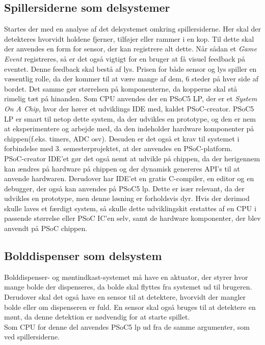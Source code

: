 \documentclass[Rapport/Rapport_main.tex]{subfiles}
\begin{document}
\subsection{Spillersiderne som delsystemer}
Startes der med en analyse af det delsystemet omkring spillersiderne. Her skal der detekteres hvorvidt holdene fjerner, tilføjer eller rammer i en kop. Til dette skal der anvendes en form for sensor, der kan registrere alt dette. Når sådan et \textit{Game Event} registreres, så er det også vigtigt for en bruger at få visuel feedback på eventet. Denne feedback skal bestå af lys. Prisen for både sensor og lys spiller en væsentlig rolle, da der kommer til at være mange af dem, 6 steder på hver side af bordet. Det samme gør størrelsen på komponenterne, da kopperne skal stå rimelig tæt på hinanden.
Som CPU anvendes der en PSoC5 LP, der er et \textit{System On A Chip}, hvor der hører et udviklings IDE med, kaldet PSoC-creator. PSoC5 LP er smart til netop dette system, da der udvikles en prototype, og den er nem at eksperimentere og arbejde med, da den indeholder hardware komponenter på chippen(f.eks. timers, ADC osv). Desuden er det også et krav til systemet i forbindelse med 3. semesterprojektet\cite{}, at der anvendes en PSoC-platform.\\ PSoC-creator IDE'et gør det også nemt at udvikle på chippen, da der herigennem kan ændres på hardware på chippen og der dynamisk genereres API's til at anvende hardwaren. Derudover har IDE'et en gratis C-compiler, en editor og en debugger, der også kan anvendes på PSoC5 lp. Dette er især relevant, da der udvikles en prototype, men denne løsning er forholdsvis dyr. Hvis der derimod skulle laves et færdigt system, så skulle dette udviklingskit erstattes af en CPU i passende størrelse eller PSoC IC'en selv, samt de hardware komponenter, der blev anvendt på PSoC chippen.
\subsection{Bolddispenser som delsystem}
Bolddispenser- og møntindkast-systemet må have en aktuator, der styrer hvor mange bolde der dispenseres, da bolde skal flyttes fra systemet ud til brugeren. Derudover skal det også have en sensor til at detektere, hvorvidt der mangler bolde eller om dispenseren er fuld. En sensor skal også bruges til at detektere en mønt, da denne detektion er nødvendig for at starte spillet.\\
Som CPU for denne del anvendes PSoC5 lp ud fra de samme argumenter, som ved spillersiderne.
\end{document}
